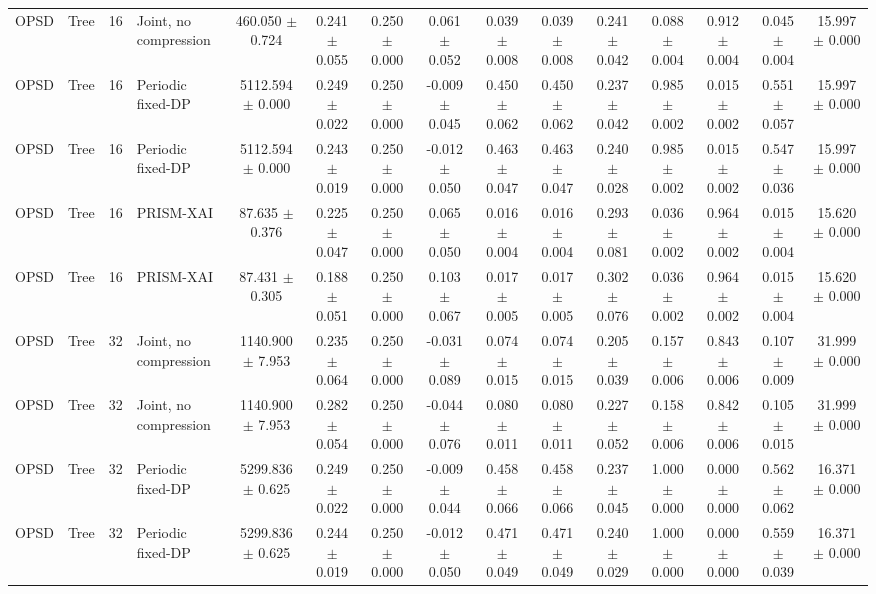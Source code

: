 \begin{table}[t]
\begin{tabular}{llllccccccccccc}
OPSD & Tree & 16 & Joint, no compression & 460.050 $\pm$ 0.724 & 0.241 $\pm$ 0.055 & 0.250 $\pm$ 0.000 & 0.061 $\pm$ 0.052 & 0.039 $\pm$ 0.008 & 0.039 $\pm$ 0.008 & 0.241 $\pm$ 0.042 & 0.088 $\pm$ 0.004 & 0.912 $\pm$ 0.004 & 0.045 $\pm$ 0.004 & 15.997 $\pm$ 0.000 \\
OPSD & Tree & 16 & Periodic fixed-DP & 5112.594 $\pm$ 0.000 & 0.249 $\pm$ 0.022 & 0.250 $\pm$ 0.000 & -0.009 $\pm$ 0.045 & 0.450 $\pm$ 0.062 & 0.450 $\pm$ 0.062 & 0.237 $\pm$ 0.042 & 0.985 $\pm$ 0.002 & 0.015 $\pm$ 0.002 & 0.551 $\pm$ 0.057 & 15.997 $\pm$ 0.000 \\
OPSD & Tree & 16 & Periodic fixed-DP & 5112.594 $\pm$ 0.000 & 0.243 $\pm$ 0.019 & 0.250 $\pm$ 0.000 & -0.012 $\pm$ 0.050 & 0.463 $\pm$ 0.047 & 0.463 $\pm$ 0.047 & 0.240 $\pm$ 0.028 & 0.985 $\pm$ 0.002 & 0.015 $\pm$ 0.002 & 0.547 $\pm$ 0.036 & 15.997 $\pm$ 0.000 \\
OPSD & Tree & 16 & PRISM-XAI & 87.635 $\pm$ 0.376 & 0.225 $\pm$ 0.047 & 0.250 $\pm$ 0.000 & 0.065 $\pm$ 0.050 & 0.016 $\pm$ 0.004 & 0.016 $\pm$ 0.004 & 0.293 $\pm$ 0.081 & 0.036 $\pm$ 0.002 & 0.964 $\pm$ 0.002 & 0.015 $\pm$ 0.004 & 15.620 $\pm$ 0.000 \\
OPSD & Tree & 16 & PRISM-XAI & 87.431 $\pm$ 0.305 & 0.188 $\pm$ 0.051 & 0.250 $\pm$ 0.000 & 0.103 $\pm$ 0.067 & 0.017 $\pm$ 0.005 & 0.017 $\pm$ 0.005 & 0.302 $\pm$ 0.076 & 0.036 $\pm$ 0.002 & 0.964 $\pm$ 0.002 & 0.015 $\pm$ 0.004 & 15.620 $\pm$ 0.000 \\
OPSD & Tree & 32 & Joint, no compression & 1140.900 $\pm$ 7.953 & 0.235 $\pm$ 0.064 & 0.250 $\pm$ 0.000 & -0.031 $\pm$ 0.089 & 0.074 $\pm$ 0.015 & 0.074 $\pm$ 0.015 & 0.205 $\pm$ 0.039 & 0.157 $\pm$ 0.006 & 0.843 $\pm$ 0.006 & 0.107 $\pm$ 0.009 & 31.999 $\pm$ 0.000 \\
OPSD & Tree & 32 & Joint, no compression & 1140.900 $\pm$ 7.953 & 0.282 $\pm$ 0.054 & 0.250 $\pm$ 0.000 & -0.044 $\pm$ 0.076 & 0.080 $\pm$ 0.011 & 0.080 $\pm$ 0.011 & 0.227 $\pm$ 0.052 & 0.158 $\pm$ 0.006 & 0.842 $\pm$ 0.006 & 0.105 $\pm$ 0.015 & 31.999 $\pm$ 0.000 \\
OPSD & Tree & 32 & Periodic fixed-DP & 5299.836 $\pm$ 0.625 & 0.249 $\pm$ 0.022 & 0.250 $\pm$ 0.000 & -0.009 $\pm$ 0.044 & 0.458 $\pm$ 0.066 & 0.458 $\pm$ 0.066 & 0.237 $\pm$ 0.045 & 1.000 $\pm$ 0.000 & 0.000 $\pm$ 0.000 & 0.562 $\pm$ 0.062 & 16.371 $\pm$ 0.000 \\
OPSD & Tree & 32 & Periodic fixed-DP & 5299.836 $\pm$ 0.625 & 0.244 $\pm$ 0.019 & 0.250 $\pm$ 0.000 & -0.012 $\pm$ 0.050 & 0.471 $\pm$ 0.049 & 0.471 $\pm$ 0.049 & 0.240 $\pm$ 0.029 & 1.000 $\pm$ 0.000 & 0.000 $\pm$ 0.000 & 0.559 $\pm$ 0.039 & 16.371 $\pm$ 0.000 \\

\end{tabular}
\end{table}
